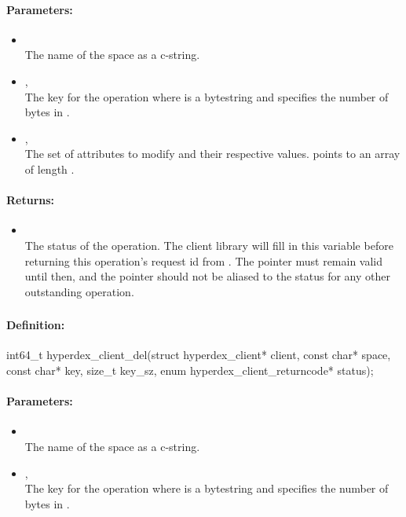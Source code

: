 \paragraph{Parameters:}
\begin{itemize}[noitemsep]
\item {}\\
The name of the space as a c-string.
\item {}, \\
The key for the operation where  is a bytestring and  specifies the number of bytes in .
\item {}, \\
The set of attributes to modify and their respective values.   points to an array of length .
\end{itemize}

\paragraph{Returns:}
\begin{itemize}[noitemsep]
\item {}\\
The status of the operation.  The client library will fill in this variable before returning this operation's request id from .  The pointer must remain valid until then, and the pointer should not be aliased to the status for any other outstanding operation.
\end{itemize}

\pagebreak
\subsubsection{}
\label{api:c:del}


\paragraph{Definition:}
\begin{ccode}
int64_t hyperdex_client_del(struct hyperdex_client* client,
        const char* space,
        const char* key, size_t key_sz,
        enum hyperdex_client_returncode* status);
\end{ccode}

\paragraph{Parameters:}
\begin{itemize}[noitemsep]
\item {}\\
The name of the space as a c-string.
\item {}, \\
The key for the operation where  is a bytestring and  specifies the number of bytes in .
\end{itemize}

